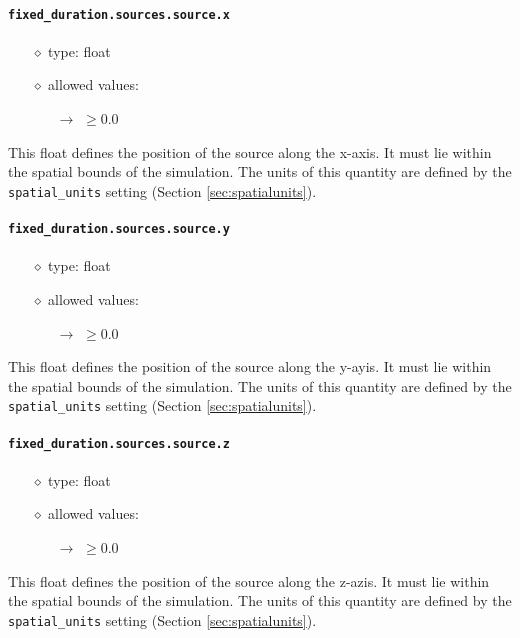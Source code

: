 \documentclass[]{article}
\def\code#1{\texttt{#1}}
\begin{document}
\paragraph{\code{fixed\_duration.sources.source.x}}\label{sec:fixsourcex}
\begin{itemize}
    \item[$\diamond$] type: float 
    \item[$\diamond$] allowed values:
    \begin{itemize}
        \item[$\rightarrow$] $\geq0.0$
    \end{itemize}
\end{itemize}
This float defines the position of the source along the x-axis. It must lie
within the spatial bounds of the simulation. The units of this quantity are
defined by the \code{spatial\_units} setting (Section \ref{sec:spatialunits}).

\paragraph{\code{fixed\_duration.sources.source.y}}\label{sec:fixsourcey}
\begin{itemize}
    \item[$\diamond$] type: float 
    \item[$\diamond$] allowed values:
    \begin{itemize}
        \item[$\rightarrow$] $\geq0.0$
    \end{itemize}
\end{itemize}
This float defines the position of the source along the y-ayis. It must lie
within the spatial bounds of the simulation. The units of this quantity are
defined by the \code{spatial\_units} setting (Section \ref{sec:spatialunits}).

\paragraph{\code{fixed\_duration.sources.source.z}}\label{sec:fixsourcez}
\begin{itemize}
    \item[$\diamond$] type: float 
    \item[$\diamond$] allowed values:
    \begin{itemize}
        \item[$\rightarrow$] $\geq0.0$
    \end{itemize}
\end{itemize}
This float defines the position of the source along the z-azis. It must lie
within the spatial bounds of the simulation. The units of this quantity are
defined by the \code{spatial\_units} setting (Section \ref{sec:spatialunits}).
\end{document}
